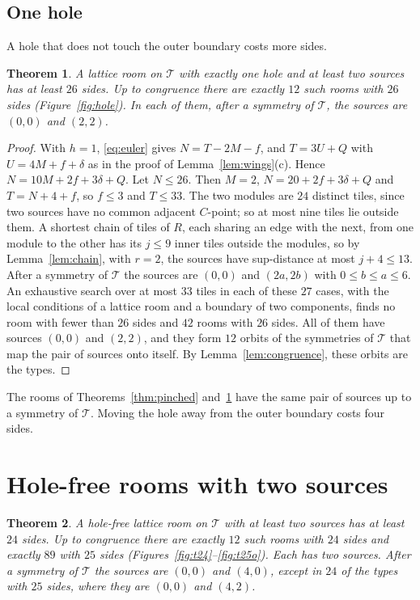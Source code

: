 \documentclass[11pt,a4paper]{article}
\theoremstyle{plain}
\newtheorem{theorem}{Theorem}[section]
\theoremstyle{definition}
\theoremstyle{remark}
\newcommand{\T}{\mathcal{T}}
\numberwithin{equation}{section}
\begin{document}
\subsection{One hole}
A hole that does not touch the outer boundary costs more sides.

\begin{theorem}\label{thm:hole}
A lattice room on $\T$ with exactly one hole and at least two sources has at least $26$ sides. Up to congruence there are exactly $12$ such rooms with $26$ sides \textup{(}Figure~\textup{\ref{fig:hole}}\textup{)}. In each of them, after a symmetry of $\T$, the sources are $(0,0)$ and $(2,2)$.
\end{theorem}

\begin{proof}
With $h=1$, \eqref{eq:euler} gives $N=T-2M-f$, and $T=3U+Q$ with $U=4M+f+\delta$ as in the proof of Lemma~\ref{lem:wings}(c). Hence $N=10M+2f+3\delta+Q$. Let $N\le26$. Then $M=2$, $N=20+2f+3\delta+Q$ and $T=N+4+f$, so $f\le3$ and $T\le33$. The two modules are $24$ distinct tiles, since two sources have no common adjacent $C$-point; so at most nine tiles lie outside them. A shortest chain of tiles of $R$, each sharing an edge with the next, from one module to the other has its $j\le9$ inner tiles outside the modules, so by Lemma~\ref{lem:chain}, with $r=2$, the sources have sup-distance at most $j+4\le13$. After a symmetry of $\T$ the sources are $(0,0)$ and $(2a,2b)$ with $0\le b\le a\le6$. An exhaustive search over at most $33$ tiles in each of these $27$ cases, with the local conditions of a lattice room and a boundary of two components, finds no room with fewer than $26$ sides and $42$ rooms with $26$ sides. All of them have sources $(0,0)$ and $(2,2)$, and they form $12$ orbits of the symmetries of $\T$ that map the pair of sources onto itself. By Lemma~\ref{lem:congruence}, these orbits are the types.
\end{proof}

The rooms of Theorems~\ref{thm:pinched} and~\ref{thm:hole} have the same pair of sources up to a symmetry of $\T$. Moving the hole away from the outer boundary costs four sides.

\section{Hole-free rooms with two sources}\label{sec:holefree}

\begin{theorem}\label{thm:tri}
A hole-free lattice room on $\T$ with at least two sources has at least $24$ sides. Up to congruence there are exactly $12$ such rooms with $24$ sides and exactly $89$ with $25$ sides \textup{(}Figures~\textup{\ref{fig:t24}--\ref{fig:t25o}}\textup{)}. Each has two sources. After a symmetry of $\T$ the sources are $(0,0)$ and $(4,0)$, except in $24$ of the types with $25$ sides, where they are $(0,0)$ and $(4,2)$.
\end{theorem}
\end{document}
